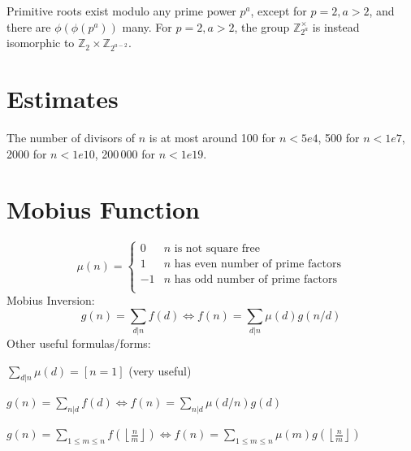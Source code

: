 	Primitive roots exist modulo any prime power $p^a$, except for $p = 2, a > 2$, and there are $\phi(\phi(p^a))$ many.
	For $p = 2, a > 2$, the group $\mathbb Z_{2^a}^\times$ is instead isomorphic to $\mathbb Z_2 \times \mathbb Z_{2^{a-2}}$.

\section{Estimates}

	The number of divisors of $n$ is at most around 100 for $n < 5e4$, 500 for $n < 1e7$, 2000 for $n < 1e10$, 200\,000 for $n < 1e19$.

\section{Mobius Function}
\[
	\mu(n) = \begin{cases} 0 & n \textrm{ is not square free}\\ 1 & n \textrm{ has even number of prime factors}\\ -1 & n \textrm{ has odd number of prime factors}\\\end{cases}
\]
  Mobius Inversion:
  \[ g(n) = \sum_{d|n} f(d) \Leftrightarrow f(n) = \sum_{d|n} \mu(d)g(n/d) \]
  Other useful formulas/forms:

  $ \sum_{d | n} \mu(d) = [ n = 1] $ (very useful)

  $ g(n) = \sum_{n|d} f(d) \Leftrightarrow f(n) = \sum_{n|d} \mu(d/n)g(d)$

 $ g(n) = \sum_{1 \leq m \leq n} f(\left\lfloor\frac{n}{m}\right \rfloor ) \Leftrightarrow f(n) = \sum_{1\leq m\leq n} \mu(m)g(\left\lfloor\frac{n}{m}\right\rfloor)$
